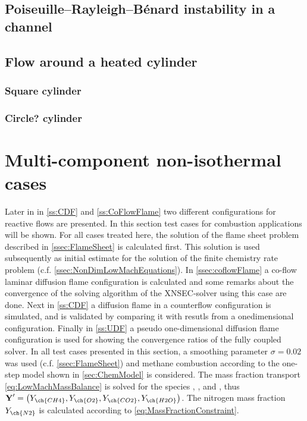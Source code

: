 \subsection{Poiseuille–Rayleigh–Bénard instability in a channel}
\blindtext[5]
\subsection{Flow around a heated cylinder}
\subsubsection{Square cylinder}
\blindtext[5]
\subsubsection{Circle? cylinder}
\blindtext[5]
\section{Multi-component non-isothermal cases}\label{sec:MultCompNonIsothermCase}
Later in in \cref{ss:CDF} and \cref{ss:CoFlowFlame} two different configurations for reactive flows are presented.
In this section test cases for combustion applications will be shown. For all cases treated here, the solution of the flame sheet problem described in \cref{ssec:FlameSheet} is calculated first. This solution is used subsequently as initial estimate for the solution of the finite chemistry rate problem (c.f. \cref{ssec:NonDimLowMachEquations}). In \cref{ssec:coflowFlame} a co-flow laminar diffusion flame configuration is calculated and some remarks about the convergence of the solving algorithm of the XNSEC-solver using this case are done. Next in \cref{ss:CDF} a diffusion flame in a counterflow configuration is simulated, and is validated by comparing it with resutls from a onedimensional configuration. Finally in \cref{ss:UDF} a pseudo one-dimensional diffusion flame configuration is used for showing the convergence ratios of the fully coupled solver. In all test cases presented in this section, a smoothing parameter $\sigma = 0.02$ was used (c.f. \cref{ssec:FlameSheet}) and methane combustion according to the one-step model shown in \cref{sec:ChemModel} is considered. The mass fraction transport \cref{eq:LowMachMassBalance} is solved for the species , ,  and , thus $\vec{Y}' = \left(Y_{\ch{CH4}},Y_{\ch{O2}},Y_{\ch{CO2}},Y_{\ch{H2O}}\right)$. The nitrogen mass fraction $Y_{\ch{N2}}$ is calculated according to \cref{eq:MassFractionConstraint}.







\FloatBarrier
